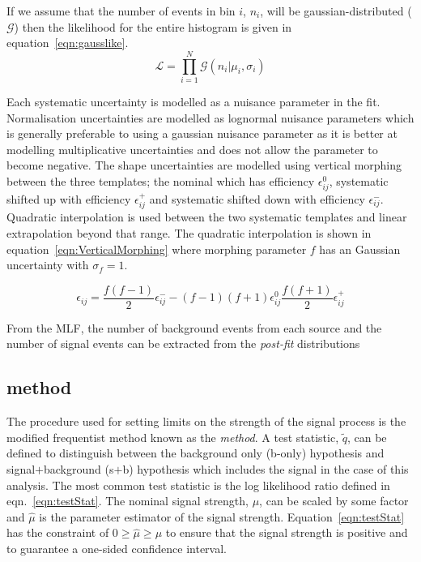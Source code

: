 If we assume that the number of events in bin $i$, $n_{i}$, will be gaussian-distributed ($\mathcal{G}$) then the likelihood for the entire histogram is given in equation~\ref{eqn:gausslike}.
\begin{equation}
\mathcal{L} = \prod_{i=1}^{N} \mathcal{G}\left(n_{i}|\mu_{i},\sigma_{i}\right)
\label{eqn:gausslike}
\end{equation}

Each systematic uncertainty is modelled as a nuisance parameter in the fit. Normalisation uncertainties are modelled as lognormal nuisance parameters which is generally preferable to using a gaussian nuisance parameter as it is better at modelling multiplicative uncertainties and does not allow the parameter to become negative. The shape uncertainties are modelled using vertical morphing between the three templates; the nominal which has efficiency $\epsilon_{ij}^{0}$, systematic shifted up with efficiency $\epsilon_{ij}^{+}$ and systematic shifted down with efficiency $\epsilon_{ij}^{-}$. Quadratic interpolation is used between the two systematic templates and linear extrapolation beyond that range. The quadratic interpolation is shown in equation~\ref{eqn:VerticalMorphing} where morphing parameter $f$ has an Gaussian uncertainty with $\sigma_{f}=1$.

\begin{equation}
\epsilon_{ij} = \frac{f\left(f-1\right)}{2}\epsilon_{ij}^{-} - \left(f-1\right)\left(f+1\right) \epsilon_{ij}^{0}  \frac{f\left(f+1\right)}{2}\epsilon_{ij}^{+}
\label{eqn:VerticalMorphing}
\end{equation}

From the MLF, the number of background events from each source and the number of signal events can be extracted from the \emph{post-fit} distributions

\subsection{\CLS method}

The procedure used for setting limits on the strength of the signal process is the modified frequentist method known as the \emph{\CLS method}.
A test statistic, $\tilde{q}$, can be defined to distinguish between the background only (b-only) hypothesis and signal$+$background (s$+$b) hypothesis which includes the \tttt signal in the case of this analysis. The most common test statistic is the log likelihood ratio defined in eqn.~\ref{eqn:testStat}. The nominal signal strength, $\mu$, can be scaled by some factor and $\hat{\mu}$ is the parameter estimator of the signal strength. Equation~\ref{eqn:testStat} has the constraint of $0\geq \hat{\mu}\geq \mu$ to ensure that the signal strength is positive and to guarantee a one-sided confidence interval.


